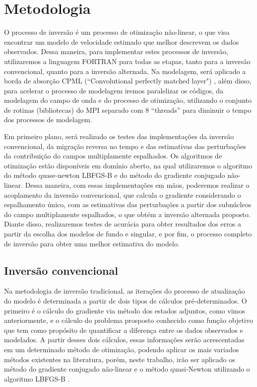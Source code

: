 \chapter{Metodologia}
O processo de inversão é um processo de otimização não-linear, o que visa encontrar um modelo de velocidade estimado que melhor descrevem os dados observados. Dessa maneira, para implementar estes processos de inversão, utilizaremos a linguagem FORTRAN para todas as etapas, tanto para a inversão convencional, quanto para a inversão alternada. Na modelagem, será aplicado a borda de absorção CPML (``Convolutional perfectly matched layer") \citep{roland_2009,pasalic_convolutional_2010}, além disso, para acelerar o processo de modelagem iremos paralelizar os códigos, da modelagem do campo de onda e do processo de otimização, utilizando o conjunto de rotinas (bibliotecas) do MPI separado com 8 ``threads'' para diminuir o tempo dos processos de modelagem.  

Em primeiro plano, será realizado os testes das implementações da inversão convencional, da migração reversa no tempo e das estimativas das perturbações da contribuição do campos multiplamente espalhados. Os algoritmos de otimização estão disponíveis em domínio aberto, na qual utilizaremos o algoritmo do método quase-newton LBFGS-B e do método do gradiente conjugado não-linear. Dessa maneira, com essas implementações em mãos, poderemos realizar o acoplamento da inversão convencional, que calcula o gradiente considerando o espalhamento único, com as estimativas das perturbações a partir dos subnúcleos do campo multiplamente espalhados, o que obtém a inversão alternada proposto. Diante disso, realizaremos testes de acurácia para obter resultados dos erros a partir da escolha dos modelos de fundo e singular, e por fim, o processo completo de inversão para obter uma melhor estimativa do modelo. 
 


\section{Inversão convencional}
Na metodologia de inversão tradicional, as iterações do processo de atualização do modelo é determinada a partir de dois tipos de cálculos pré-determinados. O primeiro é o cálculo do gradiente via método dos estados adjuntos, como vimos anteriormente, e o cálculo do problema prosposto conhecido como função objetivo que tem como propósito de quantificar a diferença entre os dados observados e modelados. A partir desses dois cálculos, essas informações serão acrescentadas em um determinado método de otimização, podendo aplicar os mais variados métodos existentes na literatura, porém, neste trabalho, irão ser aplicado os método do gradiente conjugado não-linear e o método quasi-Newton utilizando o algoritmo LBFGS-B \citep{morales_remark_2011}.  \\

